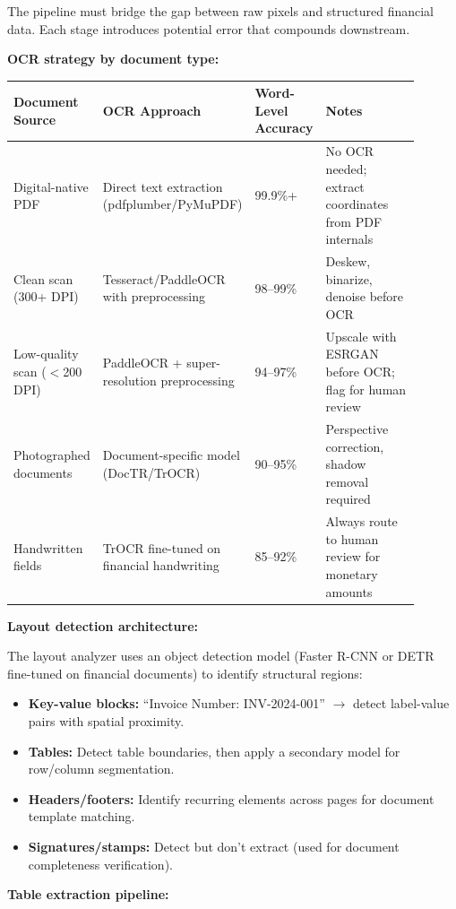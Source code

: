The pipeline must bridge the gap between raw pixels and structured financial data. Each stage introduces potential error that compounds downstream.

\textbf{OCR strategy by document type:}

\begin{tabular}{|p{0.20\linewidth}|p{0.25\linewidth}|p{0.15\linewidth}|p{0.30\linewidth}|}
\hline
\textbf{Document Source} & \textbf{OCR Approach} & \textbf{Word-Level Accuracy} & \textbf{Notes} \\
\hline
Digital-native PDF & Direct text extraction (pdfplumber/PyMuPDF) & 99.9\%+ & No OCR needed; extract coordinates from PDF internals \\
\hline
Clean scan (300+ DPI) & Tesseract/PaddleOCR with preprocessing & 98--99\% & Deskew, binarize, denoise before OCR \\
\hline
Low-quality scan ($<$200 DPI) & PaddleOCR + super-resolution preprocessing & 94--97\% & Upscale with ESRGAN before OCR; flag for human review \\
\hline
Photographed documents & Document-specific model (DocTR/TrOCR) & 90--95\% & Perspective correction, shadow removal required \\
\hline
Handwritten fields & TrOCR fine-tuned on financial handwriting & 85--92\% & Always route to human review for monetary amounts \\
\hline
\end{tabular}

\textbf{Layout detection architecture:}

The layout analyzer uses an object detection model (Faster R-CNN or DETR fine-tuned on financial documents) to identify structural regions:

\begin{itemize}
  \item \textbf{Key-value blocks:} ``Invoice Number: INV-2024-001'' $\rightarrow$ detect label-value pairs with spatial proximity.
  \item \textbf{Tables:} Detect table boundaries, then apply a secondary model for row/column segmentation.
  \item \textbf{Headers/footers:} Identify recurring elements across pages for document template matching.
  \item \textbf{Signatures/stamps:} Detect but don't extract (used for document completeness verification).
\end{itemize}

\textbf{Table extraction pipeline:}

